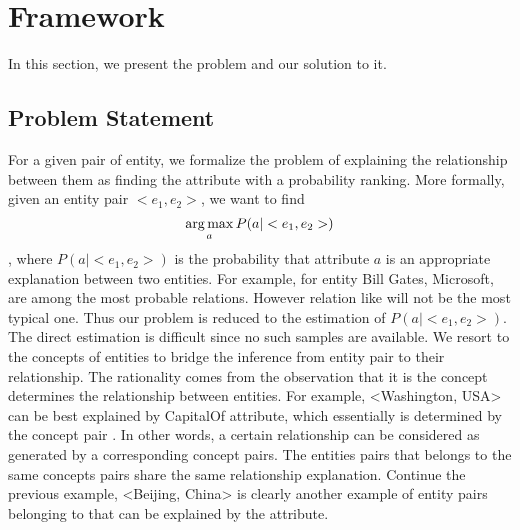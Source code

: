 
\section{Framework}
\label{sec:framework}

In this section, we present the problem and our solution to it.

\subsection{Problem Statement}

For a given pair of entity, we formalize the problem of explaining the relationship between them as finding the attribute with a probability ranking.
More formally, given an entity pair $<e_1, e_2>$, we want to find
$$\operatorname*{arg\,max}_a P(a|<e_1,e_2>)$$,
where $P(a|<e_1, e_2>)$ is the probability that attribute $a$ is an appropriate explanation between two entities.
For example, for entity \ac{Bill Gates, Microsoft},  are among the most probable relations.
However relation like  will not be the most typical one.
Thus our problem is reduced to the estimation of $P(a|<e_1, e_2>)$.
The direct estimation is difficult since no such samples are available.
We resort to the concepts of entities to bridge the inference from entity pair to their relationship.
The rationality comes from the observation that it is the concept determines the relationship between entities.
For example, \ac{<Washington, USA>} can be best explained by \ac{CapitalOf} attribute, which essentially is determined by the concept pair .
In other words, a certain relationship can be considered as generated by a corresponding concept pairs.
The entities pairs that belongs to the same concepts pairs share the same relationship explanation.
Continue the previous example, \ac{<Beijing, China>} is clearly another example of entity pairs belonging to  that can be explained by the  attribute.

